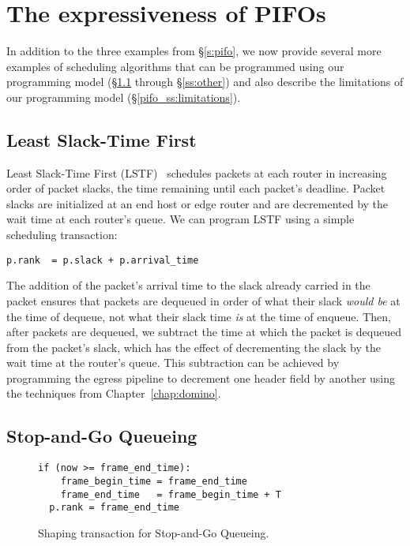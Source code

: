 \section{The expressiveness of PIFOs}
\label{s:expressive}

In addition to the three examples from \S\ref{s:pifo}, we now provide several
more examples of scheduling algorithms that can be programmed using our
programming model (\S\ref{ss:lstf} through \S\ref{ss:other}) and also describe
the limitations of our programming model (\S\ref{pifo_ss:limitations}).

\subsection{Least Slack-Time First}
\label{ss:lstf}

Least Slack-Time First (LSTF)~\cite{lstf,ups} schedules packets at each router
in increasing order of packet slacks, \ie the time remaining until each
packet's deadline.  Packet slacks are initialized at an end host or edge router
and are decremented by the wait time at each router's queue. We can program
LSTF using a simple scheduling transaction:
\begin{lstlisting}[style=customc]
  p.rank  = p.slack + p.arrival_time
\end{lstlisting}

The addition of the packet's arrival time to the slack already carried in the
packet ensures that packets are dequeued in order of what their slack {\em
would be} at the time of dequeue, not what their slack time {\em is} at the
time of enqueue. Then, after packets are dequeued, we subtract the time at
which the packet is dequeued from the packet's slack, which has the effect of
decrementing the slack by the wait time at the router's queue. This subtraction
can be achieved by programming the egress pipeline to decrement one header
field by another using the techniques from Chapter~\ref{chap:domino}.

\subsection{Stop-and-Go Queueing}
\label{ss:stopngo}

\begin{figure}[h]
  \begin{lstlisting}[style=customc]
  if (now >= frame_end_time):
    frame_begin_time = frame_end_time
    frame_end_time   = frame_begin_time + T
  p.rank = frame_end_time
  \end{lstlisting}
\caption{Shaping transaction for Stop-and-Go Queueing.}
\label{fig:stopngo}
\end{figure}

